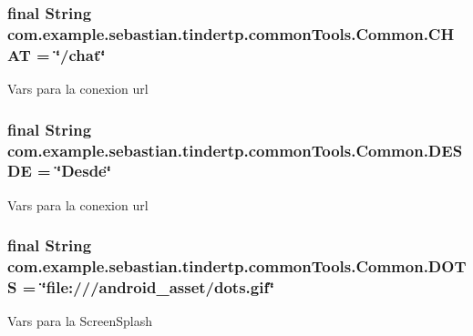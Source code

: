 \subsubsection[{\texorpdfstring{C\+H\+AT}{CHAT}}]{\setlength{\rightskip}{0pt plus 5cm}final String com.\+example.\+sebastian.\+tindertp.\+common\+Tools.\+Common.\+C\+H\+AT = \char`\"{}/chat\char`\"{}\hspace{0.3cm}{\ttfamily [static]}}\hypertarget{classcom_1_1example_1_1sebastian_1_1tindertp_1_1commonTools_1_1Common_a22cdbc7c176add88325a44caaace5168}{}\label{classcom_1_1example_1_1sebastian_1_1tindertp_1_1commonTools_1_1Common_a22cdbc7c176add88325a44caaace5168}
Vars para la conexion url 
\subsubsection[{\texorpdfstring{D\+E\+S\+DE}{DESDE}}]{\setlength{\rightskip}{0pt plus 5cm}final String com.\+example.\+sebastian.\+tindertp.\+common\+Tools.\+Common.\+D\+E\+S\+DE = \char`\"{}Desde\char`\"{}\hspace{0.3cm}{\ttfamily [static]}}\hypertarget{classcom_1_1example_1_1sebastian_1_1tindertp_1_1commonTools_1_1Common_adaea9c1bfcff07777a2434f19ea035f5}{}\label{classcom_1_1example_1_1sebastian_1_1tindertp_1_1commonTools_1_1Common_adaea9c1bfcff07777a2434f19ea035f5}
Vars para la conexion url 
\subsubsection[{\texorpdfstring{D\+O\+TS}{DOTS}}]{\setlength{\rightskip}{0pt plus 5cm}final String com.\+example.\+sebastian.\+tindertp.\+common\+Tools.\+Common.\+D\+O\+TS = \char`\"{}file\+:///android\+\_\+asset/dots.\+gif\char`\"{}\hspace{0.3cm}{\ttfamily [static]}}\hypertarget{classcom_1_1example_1_1sebastian_1_1tindertp_1_1commonTools_1_1Common_af9ff2dd415fc9361e082cf3877c8c635}{}\label{classcom_1_1example_1_1sebastian_1_1tindertp_1_1commonTools_1_1Common_af9ff2dd415fc9361e082cf3877c8c635}
Vars para la Screen\+Splash 
